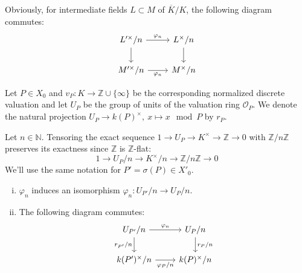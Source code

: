 \begin{remark}\label{remark-localphi-extension}
Obviously, for intermediate fields $L\subset M$ of $\overline{K}/K$, the following diagram commutes:
\[ \begin{tikzcd}
L'^\times/n \ar[r, "\varphi_n"]\dar & L^\times/n \dar\\
M'^\times/n \ar[r, "\varphi_n"'] & M^\times/n
\end{tikzcd} \]
\end{remark}

Let $P\in X_0$ and $v_P:K\to\mathbb{Z}\cup\{\infty\}$ be the corresponding normalized discrete valuation and let $U_P$ be the group of units of the valuation ring $\mathcal{O}_P$. We denote the natural projection $U_P\to k(P)^\times,\ x\mapsto x\mod P$ by $r_P$. 

Let $n\in\mathbb{N}$. Tensoring the exact sequence $1\to U_P\to K^\times \to\mathbb{Z}\to 0$ with $\mathbb{Z}/n\mathbb{Z}$ preserves its exactness since $\mathbb{Z}$ is $\mathbb{Z}$-flat:
\[ 1\longrightarrow U_P/n\longrightarrow K^\times/n\longrightarrow\mathbb{Z}/n\mathbb{Z}\longrightarrow 0 \]
We'll use the same notation for $P' = \sigma(P)\in X'_0$.

\begin{lemma}\label{4.3}
\begin{enumerate}[(i)]
\item $\varphi_n$ induces an isomorphism $\varphi_n: U_{P'}/n\to U_P/n$.
\item The following diagram commutes:
\[ \begin{tikzcd}
U_{P'}/n \rar["\varphi_n"] \dar["r_{P'}/n"'] & U_P/n \dar["r_P/n"]\\
k(P')^\times/n \rar["\varphi_P/n"'] & k(P)^\times/n
\end{tikzcd} \]
\end{enumerate}
\end{lemma}

